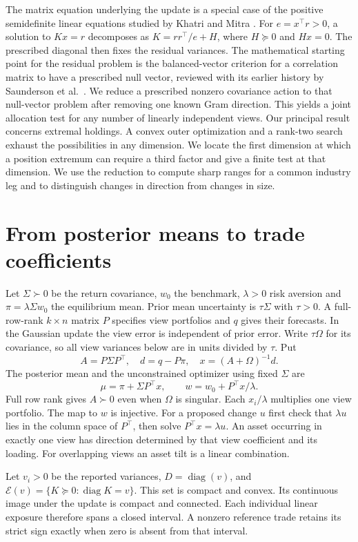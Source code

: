 \documentclass[11pt]{article}
\newcommand{\diag}{\operatorname{diag}}
\begin{document}
The matrix equation underlying the update is a special case of the positive semidefinite linear equations studied by Khatri and Mitra \cite{km}. For $e=x^\top r>0$, a solution to $Kx=r$ decomposes as $K=rr^\top/e+H$, where $H\succeq0$ and $Hx=0$. The prescribed diagonal then fixes the residual variances. The mathematical starting point for the residual problem is the balanced-vector criterion for a correlation matrix to have a prescribed null vector, reviewed with its earlier history by Saunderson et al.\ \cite{balance}. We reduce a prescribed nonzero covariance action to that null-vector problem after removing one known Gram direction. This yields a joint allocation test for any number of linearly independent views. Our principal result concerns extremal holdings. A convex outer optimization and a rank-two search exhaust the possibilities in any dimension. We locate the first dimension at which a position extremum can require a third factor and give a finite test at that dimension. We use the reduction to compute sharp ranges for a common industry leg and to distinguish changes in direction from changes in size.

\section{From posterior means to trade coefficients}
Let $\Sigma\succ0$ be the return covariance, $w_0$ the benchmark, $\lambda>0$ risk aversion and $\pi=\lambda\Sigma w_0$ the equilibrium mean. Prior mean uncertainty is $\tau\Sigma$ with $\tau>0$. A full-row-rank $k\times n$ matrix $P$ specifies view portfolios and $q$ gives their forecasts. In the Gaussian update the view error is independent of prior error. Write $\tau\Omega$ for its covariance, so all view variances below are in units divided by $\tau$. Put
\[
 A=P\Sigma P^\top,\quad d=q-P\pi,\quad x=(A+\Omega)^{-1}d .
\]
The posterior mean and the unconstrained optimizer using fixed $\Sigma$ are
\[
 \mu=\pi+\Sigma P^\top x,\qquad w=w_0+P^\top x/\lambda .
\]
Full row rank gives $A\succ0$ even when $\Omega$ is singular. Each $x_i/\lambda$ multiplies one view portfolio. The map to $w$ is injective. For a proposed change $u$ first check that $\lambda u$ lies in the column space of $P^\top$, then solve $P^\top x=\lambda u$. An asset occurring in exactly one view has direction determined by that view coefficient and its loading. For overlapping views an asset tilt is a linear combination.

Let $v_i>0$ be the reported variances, $D=\diag(v)$, and $\mathcal E(v)=\{K\succeq0:\diag K=v\}$. This set is compact and convex. Its continuous image under the update is compact and connected. Each individual linear exposure therefore spans a closed interval. A nonzero reference trade retains its strict sign exactly when zero is absent from that interval.
\end{document}
